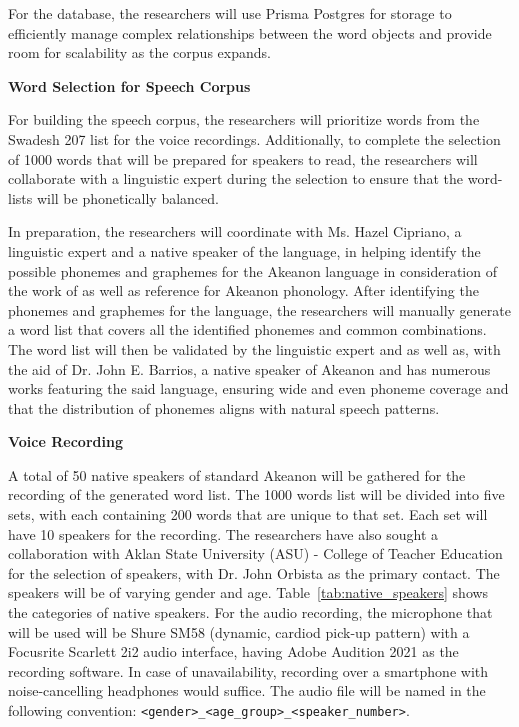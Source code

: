 For the database, the researchers will use Prisma Postgres for storage to efficiently manage complex relationships between the word objects and provide room for scalability as the corpus expands.

\textbf{Word Selection for Speech Corpus}

For building the speech corpus, the researchers will prioritize words from the Swadesh 207 list for the voice recordings. Additionally, to complete the selection of 1000 words that will be prepared for speakers to read, the researchers will collaborate with a linguistic expert during the selection to ensure that the word-lists will be phonetically balanced.

In preparation, the researchers will coordinate with  Ms. Hazel Cipriano, a linguistic expert and a native speaker of the language, in helping identify the possible phonemes and graphemes for the Akeanon language in consideration of the work of  as well as reference for Akeanon phonology. After identifying the phonemes and graphemes for the language, the researchers will manually generate a word list that covers all the identified phonemes and common combinations. The word list will then be validated by the linguistic expert and as well as, with the aid of Dr. John E. Barrios, a native speaker of Akeanon and has numerous works featuring the said language, ensuring wide and even phoneme coverage and that the distribution of phonemes aligns with natural speech patterns.

\textbf{Voice Recording}

A total of 50 native speakers of standard Akeanon will be gathered for the recording of the generated word list. The 1000 words list will be divided into five sets, with each containing 200 words that are unique to that set. Each set will have 10 speakers for the recording. The researchers have also sought a collaboration with Aklan State University (ASU) - College of Teacher Education for the selection of speakers, with Dr. John Orbista as the primary contact. The speakers will be of varying gender and age. Table~\ref{tab:native_speakers} shows the categories of native speakers. For the audio recording, the microphone that will be used will be Shure SM58 (dynamic, cardiod pick-up pattern) with a Focusrite Scarlett 2i2 audio interface, having Adobe Audition 2021 as the recording software. In case of unavailability, recording over a smartphone with noise-cancelling headphones would suffice. The audio file will be named in the following convention: \texttt{\textless gender\textgreater\_\textless age\_group\textgreater\_\textless speaker\_number\textgreater}.

